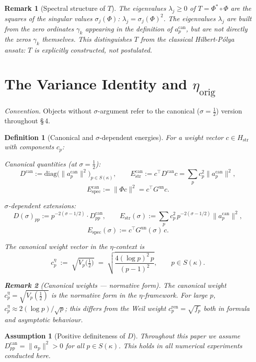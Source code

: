 \documentclass[11pt]{article}
\newtheorem{definition}[theorem]{Definition}
\newtheorem{assumption}[theorem]{Assumption}
\newtheorem*{remark}{Remark}
\newcommand{\Hstr}{H_{\mathrm{str}}}
\newcommand{\Estr}{E_{\mathrm{str}}}
\newcommand{\Espec}{E_{\mathrm{spec}}}
\newcommand{\etaorig}{\eta_{\mathrm{orig}}}
\newcommand{\Gun}{G^{\mathrm{un}}}
\newcommand{\acan}{a_p^{\mathrm{can}}}
\newcommand{\Dcan}{D^{\mathrm{can}}}
\newcommand{\Estrcan}{\Estr^{\mathrm{can}}}
\newcommand{\Especcan}{\Espec^{\mathrm{can}}}
\newcommand{\cren}{c_p^{\mathrm{ren}}}
\newcommand{\ceta}{c_p^{\eta}}
\newcommand{\fp}{f_p}
\begin{document}
\begin{remark}[Spectral structure of $T$]
The eigenvalues $\lambda_j\geq 0$ of $T=\Phi^*\circ\Phi$ are the squares of
the singular values $\sigma_j(\Phi)$: $\lambda_j=\sigma_j(\Phi)^2$.
The eigenvalues $\lambda_j$ are built from the zero ordinates $\gamma_k$
appearing in the definition of $\acan$, but are \emph{not} directly the zeros
$\gamma_k$ themselves. This distinguishes $T$ from the classical Hilbert-P\'olya
ansatz: $T$ is explicitly constructed, not postulated.
\end{remark}

\section{The Variance Identity and $\etaorig$}

\emph{Convention.} Objects without $\sigma$-argument refer to the canonical
($\sigma=\tfrac12$) version throughout \S\,4.

\begin{definition}[Canonical and $\sigma$-dependent energies]
\label{def:energies}
For a weight vector $c\in\Hstr$ with components $c_p$:

\emph{Canonical quantities} (at $\sigma=\tfrac12$):
\[
\Dcan:=\mathrm{diag}\!\bigl(\|\acan\|^2\bigr)_{p\in S(\kappa)},
\qquad
\Estrcan:=c^\top\Dcan c=\sum_p c_p^2\|\acan\|^2,
\]
\[
\Especcan:=\|\Phi c\|^2=c^\top\Gun c.
\]

\emph{$\sigma$-dependent extensions:}
\[
D(\sigma)_{pp}:=p^{-2(\sigma-1/2)}\cdot\Dcan_{pp},
\qquad
\Estr(\sigma):=\sum_p c_p^2\,p^{-2(\sigma-1/2)}\|\acan\|^2,
\]
\[
\Espec(\sigma):=c^\top\Gun(\sigma)\,c.
\]

The \emph{canonical weight vector} in the $\eta$-context is
\[
\ceta \;:=\; \sqrt{V_p\!\bigl(\tfrac12\bigr)}
    \;=\; \sqrt{\frac{4(\log p)^2\,p}{(p-1)^2}},
    \qquad p \in S(\kappa).
\]
\begin{remark}[Canonical weights --- normative form]
The canonical weight $\ceta = \sqrt{V_p(\tfrac12)}$
is the normative form in the $\eta$-framework. For large $p$,
$\ceta \approx 2(\log p)/\!\sqrt{p}$; this differs from the Weil weight
$\cren = \sqrt{\fp}$ both in formula and asymptotic behaviour.
\end{remark}
\end{definition}

\begin{assumption}[Positive definiteness of $D$]
Throughout this paper we assume $\Dcan_{pp}=\|a_p\|^2>0$ for all
$p\in S(\kappa)$. This holds in all numerical experiments conducted here.
\end{assumption}
\end{document}
